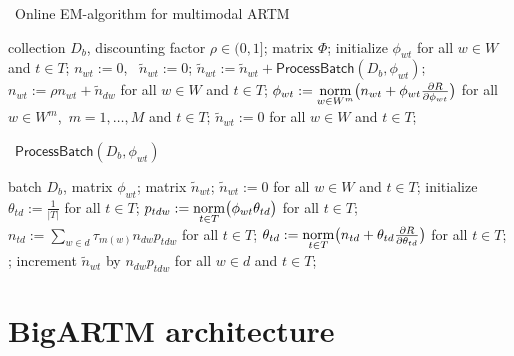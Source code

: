 \documentclass{llncs}
\newcommand{\norm}{\mathop{\rm norm}\limits}
\newcommand{\kw}[1]{\textsf{#1}}
\begin{document}
\begin{algorithm}[t]
\caption{~Online EM-algorithm for multimodal ARTM}
\label{alg:Online}
\begin{algorithmic}[1]
\REQUIRE collection $D_b$, discounting factor $\rho\in(0,1]$;
\ENSURE matrix $\Phi$;
\STATE initialize $\phi_{wt}$ for all $w \in W$ and $t \in T$;
\STATE $n_{wt} := 0$,~ $\tilde n_{wt} := 0$;
    \STATE $\tilde n_{wt} := \tilde n_{wt} + \kw{ProcessBatch}(D_b, \phi_{wt})$;
     \label{alg:sync}
        \STATE \label{alg:merging}
               $n_{wt} := \rho n_{wt} + \tilde n_{dw}$ for all $w \in W$ and $t \in T$;
        \STATE \label{alg:phi}
               $\phi_{wt} := \norm_{w\in W^m}
                    \bigl(
                        n_{wt} + \phi_{wt} \frac{\partial R}{\partial \phi_{wt}}
                    \bigr)$
               for all $w \in W^m$,\, $m=1,\dots,M$ and $t \in T$;
        \STATE $\tilde n_{wt} := 0$ for all $w \in W$ and $t \in T$;
    \ENDIF
\ENDFOR
\end{algorithmic}
\end{algorithm}

\begin{algorithm}[t]
\caption{~$\kw{ProcessBatch} (D_b, \phi_{wt})$}
\label{alg:ProcessBatch}
\begin{algorithmic}[1]
\REQUIRE batch $D_b$, matrix $\phi_{wt}$;
\ENSURE matrix $\tilde n_{wt}$;
\STATE $\tilde n_{wt} := 0$ for all $w \in W$ and $t \in T$;
	\STATE initialize $\theta_{td} := \frac{1}{|T|}$ for all $t \in T$;
	\REPEAT
        \STATE $p_{tdw} := \norm_{t\in T} \bigl(\phi_{wt}\theta_{td}\bigr)$ for all $t \in T$;
        \STATE $n_{td} := \sum_{w\in d} \tau_{m(w)} n_{dw} p_{tdw}$ for all $t \in T$;
        \STATE $\theta_{td} := \norm_{t\in T}
                    \bigl(
                        n_{td} + \theta_{td} \frac{\partial R}{\partial \theta_{td}}
                    \bigr)$ for all $t \in T$;
	;
	\STATE increment $\tilde n_{wt}$ by $n_{dw} p_{tdw}$ for all $w \in d$ and $t \in T$;
\ENDFOR
\end{algorithmic}
\end{algorithm}


\section{BigARTM architecture}
\label{sec:BigARTM}
\end{document}
